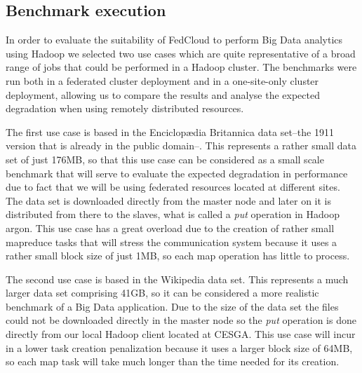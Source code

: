 \documentclass[oribibl]{llncs_Ibergrid2013}
\begin{document}


\subsection{Benchmark execution}
\label{ssect-execution}

In order to evaluate the suitability of FedCloud to perform Big Data analytics using Hadoop we selected two use cases which are quite representative of a broad range of jobs that could be performed in a Hadoop cluster. The benchmarks were run both in a federated cluster deployment and in a one-site-only cluster deployment, allowing us to compare the results and analyse the expected degradation when using remotely distributed resources.




The first use case is based in the Enciclop{\ae}dia Britannica\cite{britannica} data set--the 1911 version that is already in the public domain--. This represents a rather small data set of just 176MB, so that this use case can be considered as a small scale benchmark that will serve to evaluate the expected degradation in performance due to fact that we will be using federated resources located at different sites. The data set is downloaded directly from the master node and later on it is distributed from there to the slaves, what is called a \emph{put} operation in Hadoop argon. This use case has a great overload due to the creation of rather small mapreduce tasks that will stress the communication system because it uses a rather small block size of just 1MB, so each map operation has little to process.

The second use case is based in the Wikipedia\cite{wikipedia} data set. This represents a much larger data set comprising 41GB, so it can be considered a more realistic benchmark of a Big Data application. Due to the size of the data set the files could not be downloaded directly in the master node so the \emph{put} operation is done directly from our local Hadoop client located at CESGA. This use case will incur in a lower task creation penalization because it uses a larger block size of 64MB, so each map task will take much longer than the time needed for its creation.
\end{document}
